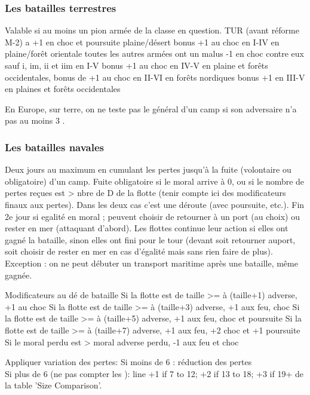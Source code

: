 \subsubsection{Les batailles terrestres}
 Valable si au moins un pion armée
de la classe en question.
  TUR (avant réforme M-2) a +1 en choc et poursuite plaine/désert
\bparag[iim]  bonus +1 au choc en I-IV en plaine/forêt orientale
\bparag[tercios] toutes les autres armées ont un malus -1 en choc contre eux sauf
       i, im, ii et iim en I-V
\bparag[iiim] bonus +1 au choc en IV-V en plaine et forêts occidentales,
\bparag[SUE] bonus de +1 au choc en II-VI en forêts nordiques
\bparag[iv] bonus +1 en III-V en plaines et forêts occidentales

En Europe, sur terre, on ne teste pas le général d'un camp si son adversaire
n'a pas au moins 3 \LD.

\subsubsection{Les batailles navales}
\aparag Deux jours au maximum en cumulant les pertes jusqu'à la fuite (volontaire
ou obligatoire) d'un camp.
\bparag Fuite obligatoire
       si le moral arrive à 0, ou
       si le nombre de pertes reçues est > nbre de D de la flotte
               (tenir compte ici des modificateurs finaux aux pertes).
     Dans les deux cas c'est une déroute (avec poursuite, etc.).
\bparag Fin 2e jour si egalité en moral ;
peuvent choisir de retourner à un port (au choix) ou rester en mer (attaquant
d'abord).
\bparag Les flottes continue leur action si elles ont gagné la bataille, sinon
elles ont fini pour le tour (devant soit retourner auport, soit choisir de rester en mer
en cas d'égalité mais sans rien faire de plus).
Exception : on ne peut débuter un transport maritime après une bataille, même gagnée.

 Modificateurs au dé de bataille
\bparag Si la flotte est de taille >= à (taille+1) adverse, +1 au choc
\bparag Si la flotte est de taille >= à (taille+3) adverse, +1 aux feu, choc
\bparag Si la flotte est de taille >= à (taille+5) adverse, +1 aux feu, choc et poursuite
\bparag Si la flotte est de taille >= à (taille+7) adverse, +1 aux feu,  +2 choc et +1 poursuite
\bparag Si le moral perdu est > moral adverse perdu, -1 aux feu et choc

Appliquer variation des pertes:
\bparag Si moins de 6 \ND : réduction des pertes \\
Si plus de 6 \ND (ne pas compter les \NDE):
line +1 if 7 to 12\DN; +2 if 13 to 18\DN; +3 if 19+\DN
de la table 'Size Comparison'.

